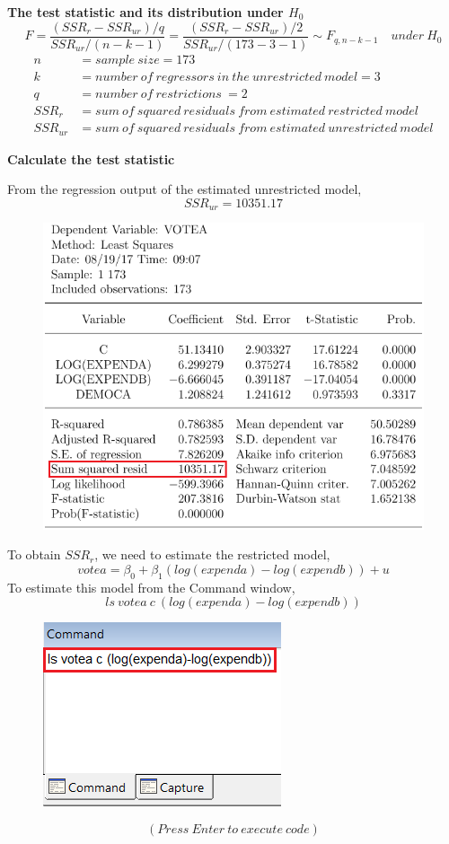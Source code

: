 \documentclass[12pt]{report}
\begin{document}
\noindent \textbf{The test statistic and its distribution under $H_0$}
$$F = \dfrac{(SSR_r - SSR_{ur})/q}{SSR_{ur}/(n-k-1)} = \dfrac{(SSR_r - SSR_{ur})/2}{SSR_{ur}/(173-3-1)} \sim F_{q,n-k-1} \quad under\ H_0$$
\begin{align*}
n &= sample\ size = 173 \\
k &= number\ of\ regressors\ in\ the\ unrestricted\ model = 3 \\
q &= number\ of\ restrictions\ = 2 \\
SSR_{r} &= sum\ of\ squared\ residuals\ from\ estimated\ restricted\ model \\
SSR_{ur} &= sum\ of\ squared\ residuals\ from\ estimated\ unrestricted\ model
\end{align*}

\noindent \textbf{Calculate the test statistic}

\noindent From the regression output of the estimated unrestricted model,
$$SSR_{ur} = 10351.17$$
\begin{figure}[H]
	\centering
	\includegraphics{q1_15}
\end{figure}
\vspace{-\baselineskip}
\noindent To obtain $SSR_r$, we need to estimate the restricted model,
$$votea = \beta_0 + \beta_1(log(expenda) - log(expendb)) + u $$
\noindent To estimate this model from the Command window,
$$ls\ votea\ c\ (log(expenda)-log(expendb))$$
\begin{figure}[H]
	\centering
	\includegraphics{q1_16}
\end{figure}
\vspace{-\baselineskip}
$$(Press\ Enter\ to\ execute\ code)$$
\end{document}
